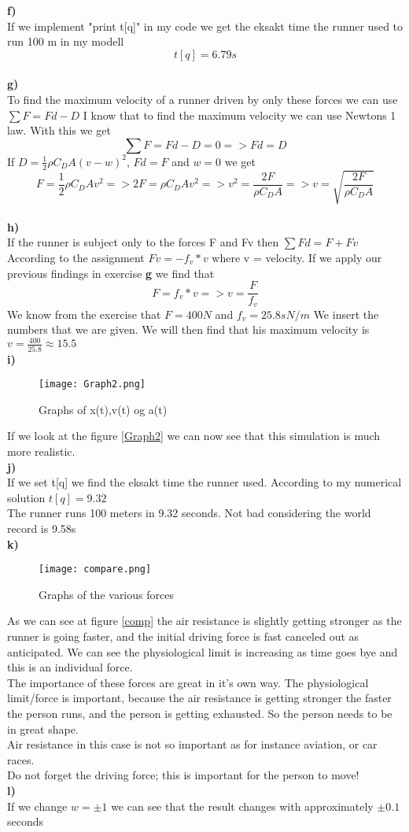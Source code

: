 \documentclass[,engelsk]{article}
\begin{document}
\textbf{f)}\\
If we implement "print t[q]" in my code we get the eksakt time the runner used to run 100 m in my modell
$$t[q] = 6.79s$$\\
\textbf{g)}\\
To find the maximum velocity of a runner driven by only these forces we can use 
$\sum F = Fd - D$ I know that to find the maximum velocity we can use Newtons 1 law. With this we get $$\sum F = Fd - D = 0 => Fd = D$$ If $D = \frac{1}{2}\rho C_{D}A(v-w)^2$, $Fd = F$ and $w = 0$ we get 
$$F = \frac{1}{2}\rho C_{D}Av^2 => 2F = \rho C_{D}Av^2 => v^2 = \frac{2F}{\rho C_{D}A} => v = \sqrt{\frac{2F}{\rho C_{D}A} }$$\\
\textbf{h)}\\
If the runner is subject only to the forces F and Fv then $\sum Fd = F + Fv$ According to the assignment $Fv = -f_{v}*v$ where v = velocity. If we apply our previous findings in exercise \textbf{g} we find that  
$$F = f_{v}*v => v = \frac{F}{f_{v}}$$ We know from the exercise that $F = 400N$ and $f_{v} = 25.8sN/m$ We insert the numbers that we are given. We will then find that his maximum velocity is $v = \frac{400}{25.8}\approx 15.5$\\
\textbf{i)}\\

\begin{figure}[h!]
\texttt{[image: Graph2.png]} 
\caption{Graphs of x(t),v(t) og a(t)}
\label{Graph2}
\end{figure}
If we look at the figure \vref{Graph2} we can now see that this simulation is much more realistic.\\
\textbf{j)}\\
If we set t[q] we find the eksakt time the runner used. According to my numerical solution $t[q] = 9.32$ \\
The runner runs 100 meters in 9.32 seconds. Not bad considering the world record is 9.58s\\
\textbf{k)}\\
\begin{figure}[h!]
\texttt{[image: compare.png]} 
\caption{Graphs of the various forces}
\label{comp}
\end{figure}
As we can see at figure \vref{comp} the air resistance is slightly getting stronger as the runner is going faster, and the initial driving force is fast canceled out as anticipated. We can see the physiological limit is increasing as time goes bye and this is an individual force.\\ The importance of these forces are great in it's own way. The physiological limit/force is important, because the air resistance is getting stronger the faster the person runs, and the person is getting exhausted. So the person needs to be in great shape.\\
Air resistance in this case is not so important as for instance aviation, or car races.\\ Do not forget the driving force; this is important for the person to move! 
\\ 
\textbf{l)}\\
If we change $w = \pm 1$ we can see that the result changes with approximately $\pm 0.1$ seconds
\end{document}
